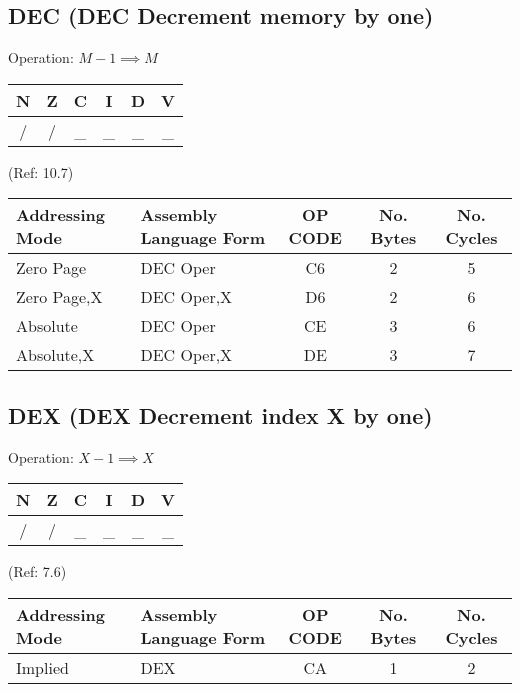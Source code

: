 \documentclass{article}
\begin{document}
  \subsection{DEC (DEC Decrement memory by one)}

  Operation:  $M - 1 \implies M$
  \begin{table}[H]
  \centering
  \begin{tabular}{|c c c c c c|}
  \hline
  N&Z&C&I&D&V\\
  \hline
  / & / & \_ & \_ & \_ & \_\\
  \hline
  \end{tabular}
  \end{table}
                                   (Ref: 10.7)
  \begin{table}[H]
  \centering
  \begin{tabular}{|l|l|c|c|c|}
  \hline
   Addressing Mode& Assembly Language Form& OP CODE &No. Bytes&No. Cycles\\
  \hline
    Zero Page     &   DEC Oper            &    C6   &    2    &    5     \\
    Zero Page,X   &   DEC Oper,X          &    D6   &    2    &    6     \\
    Absolute      &   DEC Oper            &    CE   &    3    &    6     \\
    Absolute,X    &   DEC Oper,X          &    DE   &    3    &    7     \\
  \hline
  \end{tabular}
  \end{table}


  \subsection{DEX (DEX Decrement index X by one)}

  Operation:  $X - 1 \implies X$
  \begin{table}[H]
  \centering
  \begin{tabular}{|c c c c c c|}
  \hline
  N&Z&C&I&D&V\\
  \hline
  / & / & \_ & \_ & \_ & \_\\
  \hline
  \end{tabular}
  \end{table}
                                 (Ref: 7.6)
  \begin{table}[H]
  \centering
  \begin{tabular}{|l|l|c|c|c|}
  \hline
   Addressing Mode& Assembly Language Form& OP CODE &No. Bytes&No. Cycles\\
  \hline
    Implied       &   DEX                 &    CA   &    1    &    2     \\
  \hline
  \end{tabular}
  \end{table}
\end{document}
